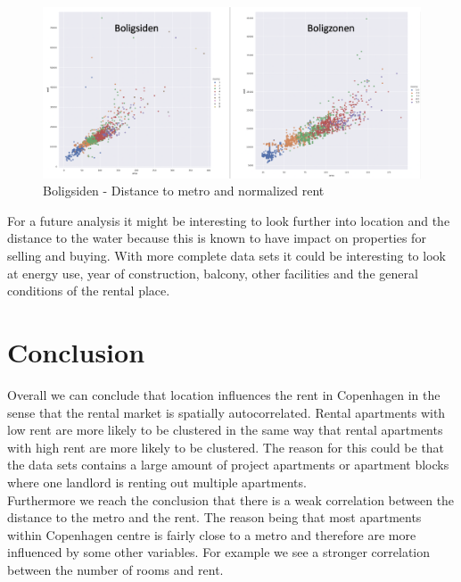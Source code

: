 \documentclass{article}
\begin{document}
\begin{figure}[H]
    \centering
    \includegraphics[scale=0.4]{images/room_area_price.png}
    \caption{Boligsiden - Distance to metro and normalized rent}
    \label{fig:metro_norm_rent}
\end{figure}

For a future analysis it might be interesting to look further into location and the distance to the water because this is known to have impact on properties for selling and buying. With more complete data sets it could be interesting to look at energy use, year of construction, balcony, other facilities and the general conditions of the rental place. 





\section{Conclusion}

Overall we can conclude that location influences the rent in Copenhagen in the sense that the rental market is spatially autocorrelated. Rental apartments with low rent are more likely to be clustered in the same way that rental apartments with high rent are more likely to be clustered. The reason for this could be that the data sets contains a large amount of project apartments or apartment blocks where one landlord is renting out multiple apartments. \\
Furthermore we reach the conclusion that there is a weak correlation between the distance to the metro and the rent. The reason being that most apartments within Copenhagen centre is fairly close to a metro and therefore are more influenced by some other variables. For example we see a stronger correlation between the number of rooms and rent. 
\end{document}
